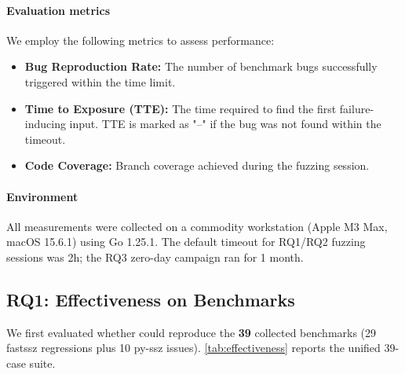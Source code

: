 \paragraph{Evaluation metrics}
We employ the following metrics to assess performance:
\begin{itemize}
    \item \textbf{Bug Reproduction Rate:} The number of benchmark bugs successfully triggered within the time limit.
    \item \textbf{Time to Exposure (TTE):} The time required to find the first failure-inducing input. TTE is marked as "--" if the bug was not found within the timeout.
    \item \textbf{Code Coverage:} Branch coverage achieved during the fuzzing session.
\end{itemize}

\paragraph{Environment}
All measurements were collected on a commodity workstation (Apple M3 Max, macOS 15.6.1) using Go 1.25.1. The default timeout for RQ1/RQ2 fuzzing sessions was 2h; the RQ3 zero-day campaign ran for 1 month.

\subsection{RQ1: Effectiveness on Benchmarks}


We first evaluated whether \tool could reproduce the \textbf{39} collected benchmarks (29 fastssz regressions plus 10 py-ssz issues). \autoref{tab:effectiveness} reports the unified 39-case suite.



